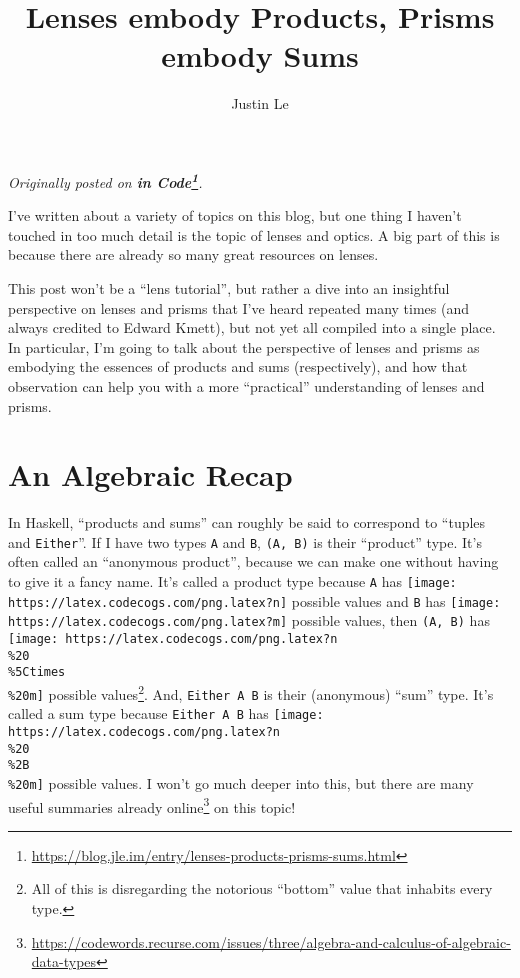 \documentclass[]{article}
\title{Lenses embody Products, Prisms embody Sums}
\author{Justin Le}
\renewcommand{\href}[2]{#2\footnote{\url{#1}}}
\begin{document}
\maketitle

\emph{Originally posted on
\textbf{\href{https://blog.jle.im/entry/lenses-products-prisms-sums.html}{in
Code}}.}

I've written about a variety of topics on this blog, but one thing I haven't
touched in too much detail is the topic of lenses and optics. A big part of this
is because there are already so many great resources on lenses.

This post won't be a ``lens tutorial'', but rather a dive into an insightful
perspective on lenses and prisms that I've heard repeated many times (and always
credited to Edward Kmett), but not yet all compiled into a single place. In
particular, I'm going to talk about the perspective of lenses and prisms as
embodying the essences of products and sums (respectively), and how that
observation can help you with a more ``practical'' understanding of lenses and
prisms.

\hypertarget{an-algebraic-recap}{%
\section{An Algebraic Recap}\label{an-algebraic-recap}}

In Haskell, ``products and sums'' can roughly be said to correspond to ``tuples
and \texttt{Either}''. If I have two types \texttt{A} and \texttt{B},
\texttt{(A,\ B)} is their ``product'' type. It's often called an ``anonymous
product'', because we can make one without having to give it a fancy name. It's
called a product type because \texttt{A} has
\texttt{[image: https://latex.codecogs.com/png.latex?n]} possible values and
\texttt{B} has \texttt{[image: https://latex.codecogs.com/png.latex?m]} possible
values, then \texttt{(A,\ B)} has
\texttt{[image: https://latex.codecogs.com/png.latex?n\\\%20\\\%5Ctimes\\\%20m]}
possible values\footnote{All of this is disregarding the notorious ``bottom''
  value that inhabits every type.}. And, \texttt{Either\ A\ B} is their
(anonymous) ``sum'' type. It's called a sum type because \texttt{Either\ A\ B}
has \texttt{[image: https://latex.codecogs.com/png.latex?n\\\%20\\\%2B\\\%20m]}
possible values. I won't go much deeper into this, but there are
\href{https://codewords.recurse.com/issues/three/algebra-and-calculus-of-algebraic-data-types}{many
useful summaries already online} on this topic!
\end{document}

